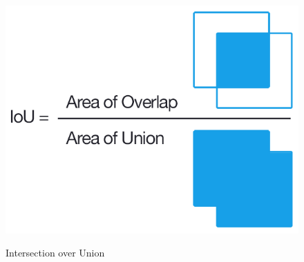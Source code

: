 \documentclass[12pt]{report}
\begin{document}
\begin{figure}[H]\includegraphics[scale=0.5]{IoU.png}\centering\caption{Intersection over Union}\cite{IoU} \label{fig:Intersection over Union} \end{figure}%





\end{document}
